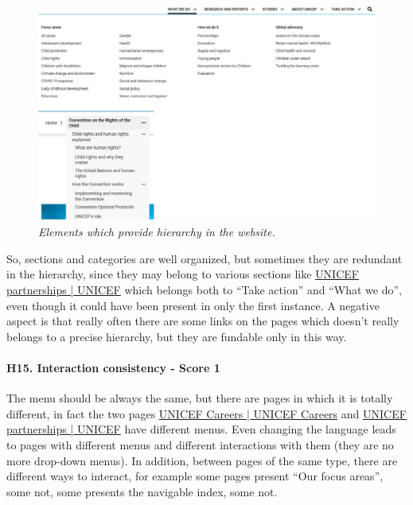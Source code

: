 \begin{figure}[!h]
	\begin{center}
		\includegraphics[width=\textwidth]{FinalScores18.jpg}
		\captionsetup{font=small}
		\caption{\textit{Elements which provide hierarchy in the website.}}
	\end{center}
\end{figure}
\newline
So, sections and categories are well organized, but sometimes they are redundant in the hierarchy, since they may belong to various sections like \href{https://www.unicef.org/partnerships}{UNICEF partnerships | UNICEF} which belongs both to “Take action” and “What we do”, even though it could have been present in only the first instance. 
\newline A negative aspect is that really often there are some links on the pages which doesn’t really belongs to a precise hierarchy, but they are fundable only in this way.
\newline
\newline \paragraph{H15. Interaction consistency - Score 1}	\label{subsec:H15}The menu should be always the same, but there are pages in which it is totally different, in fact the two pages \href{https://www.unicef.org/careers/}{UNICEF Careers | UNICEF Careers} and \href{https://www.unicef.org/partnerships}{UNICEF partnerships | UNICEF} have different menus. Even changing the language leads to pages with different menus and different interactions with them (they are no more drop-down menus).
\newline In addition, between pages of the same type, there are different ways to interact, for example  some pages present “Our focus areas”, some not, some presents the navigable index, some not.
